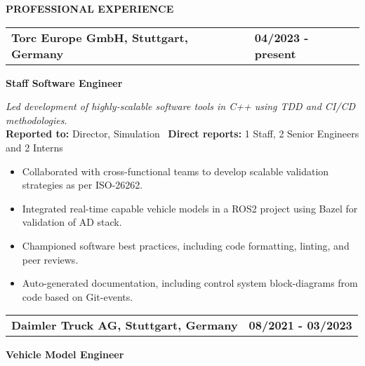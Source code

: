 \documentclass[a4paper,10pt]{article}
\begin{document}
\vspace{0.1cm}
\noindent{\rule{\linewidth}{1.4pt}}
\textbf{PROFESSIONAL EXPERIENCE}

\vspace{-0.1cm}
\noindent{\rule{\linewidth}{0.01cm}}

\noindent
\begin{tabular}{ @{\hskip 0pt}m{} >{\raggedleft\arraybackslash}p{} }
    \noindent\textbf{Torc Europe GmbH, Stuttgart, Germany} & \textbf{04/2023 - present}
\end{tabular}

\noindent
\colorbox{gray!40}{%
    \parbox{0.99\textwidth}{%
        \textcolor{highlightcolor}{\textbf{Staff Software Engineer}}
    }%
}

\vspace{0.2cm}
\noindent
\textit{Led development of highly-scalable software tools in C++ using TDD and CI/CD methodologies.}\\

\vspace{-0.3cm}
\noindent
\textbf{Reported to:} Director, Simulation \, \textbf{Direct reports:} 1 Staff, 2 Senior Engineers and 2 Interns \, 
\begin{itemize}[itemsep=0pt, topsep=5pt]
  \item Collaborated with cross-functional teams to
      develop scalable validation strategies as per ISO-26262.
  \item Integrated real-time capable vehicle models in a ROS2 project
      using Bazel for validation of AD stack.
  \item Championed software best practices, including code formatting, linting, and peer reviews.
  \item Auto-generated documentation, including control system block-diagrams from code based on Git-events.
\end{itemize}

\vspace{0.3cm}
\noindent
\begin{tabular}{ @{\hskip 0pt}m{} >{\raggedleft\arraybackslash}p{} }
    \noindent\textbf{Daimler Truck AG, Stuttgart, Germany} & \textbf{08/2021 - 03/2023}
\end{tabular}

\noindent
\colorbox{gray!40}{%
    \parbox{0.99\textwidth}{%
        \textcolor{highlightcolor}{\textbf{Vehicle Model Engineer}}
    }%
}
\end{document}

